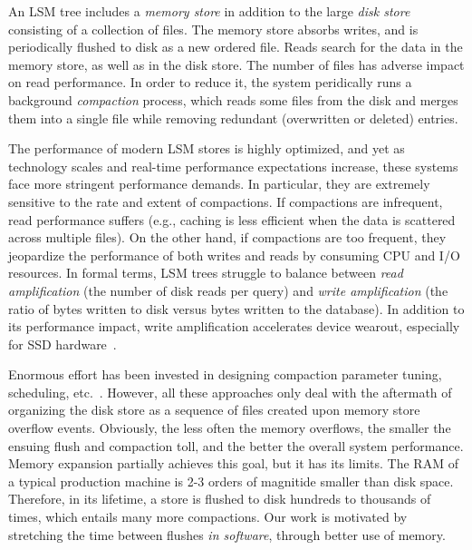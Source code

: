 An LSM tree includes a \emph{memory store} in addition to the large \emph{disk store} consisting of a collection of files. 
The memory store absorbs writes, and is periodically flushed to disk as a new ordered file. Reads search for the data
in the memory store, as well as in the disk store. The number of files has adverse impact on read performance. 
In order to reduce it, the system peridically runs a background \emph{compaction} process, which reads some files from 
the disk and merges them into a single file while removing redundant (overwritten or deleted) entries.%

The performance of modern LSM stores is highly optimized, and yet as technology scales and real-time 
performance expectations increase, these systems face more stringent performance demands. In particular, 
they are extremely sensitive to the rate and extent of compactions. If compactions are infrequent, read performance
suffers (e.g., caching is less efficient when the data is scattered across multiple files). On the other hand, if 
compactions are too frequent, they jeopardize the performance of both writes and reads by consuming CPU 
and I/O resources. In formal terms, LSM trees struggle to balance between {\em read amplification} (the number 
of disk reads per query) and {\em write amplification} (the ratio of bytes written to disk versus bytes written to the 
database). In addition to its performance impact, write amplification accelerates device wearout, especially for SSD 
hardware~\cite{Hu:2009}. 

Enormous effort has been invested in designing compaction parameter tuning, scheduling, etc.~\cite{hbasetuning,
universalcompaction,scylladbcompaction,Sears:2012}. However, all these approaches only deal with the aftermath
of organizing the disk store as a sequence of files created upon memory store overflow events. Obviously, the less 
often the memory overflows, the smaller the ensuing flush and compaction toll, and the better the overall 
system performance. Memory expansion partially achieves this goal, but it has its limits. The RAM of a typical 
production machine is 2-3 orders of magnitide smaller than disk space. 
Therefore, in its lifetime, a store is flushed to disk hundreds to thousands of times, which entails many more compactions. 
Our work is motivated by stretching the time between flushes {\em in software}, through better use of memory. 

